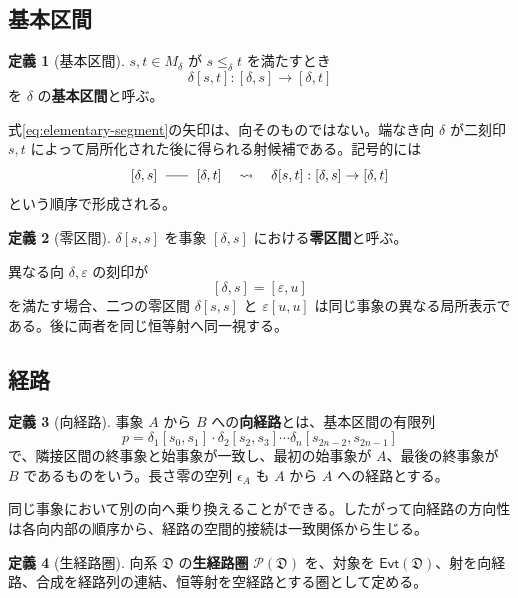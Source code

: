 \documentclass[a4paper,11pt]{ltjsarticle}
\theoremstyle{definition}
\newtheorem{definition}{定義}[section]
\theoremstyle{plain}
\newcommand{\Evt}{\mathsf{Evt}}
\newcommand{\dline}{\mathrel{\rule[0.55ex]{1.6em}{0.4pt}}}
\begin{document}
\subsection{基本区間}

\begin{definition}[基本区間]
$s,t\in M_\delta$ が $s\leq_\delta t$ を満たすとき
\begin{equation}
 \delta[s,t]:[\delta,s]\longrightarrow[\delta,t]
 \label{eq:elementary-segment}
\end{equation}
を $\delta$ の\textbf{基本区間}と呼ぶ。
\end{definition}

式\eqref{eq:elementary-segment}の矢印は、向そのものではない。端なき向 $\delta$ が二刻印 $s,t$ によって局所化された後に得られる射候補である。記号的には
\[
 [\delta,s]\ \dline\ [\delta,t]
 \quad\leadsto\quad
 \delta[s,t]:[\delta,s]\to[\delta,t]
\]
という順序で形成される。

\begin{definition}[零区間]
$\delta[s,s]$ を事象 $[\delta,s]$ における\textbf{零区間}と呼ぶ。
\end{definition}

異なる向 $\delta,\varepsilon$ の刻印が
\[
 [\delta,s]=[\varepsilon,u]
\]
を満たす場合、二つの零区間 $\delta[s,s]$ と $\varepsilon[u,u]$ は同じ事象の異なる局所表示である。後に両者を同じ恒等射へ同一視する。

\subsection{経路}

\begin{definition}[向経路]
事象 $A$ から $B$ への\textbf{向経路}とは、基本区間の有限列
\begin{equation}
 p=
 \delta_1[s_0,s_1]
 \cdot
 \delta_2[s_2,s_3]
 \cdots
 \delta_n[s_{2n-2},s_{2n-1}]
 \label{eq:direction-path}
\end{equation}
で、隣接区間の終事象と始事象が一致し、最初の始事象が $A$、最後の終事象が $B$ であるものをいう。長さ零の空列 $\epsilon_A$ も $A$ から $A$ への経路とする。
\end{definition}

同じ事象において別の向へ乗り換えることができる。したがって向経路の方向性は各向内部の順序から、経路の空間的接続は一致関係から生じる。

\begin{definition}[生経路圏]
向系 $\mathfrak D$ の\textbf{生経路圏} $\mathcal P(\mathfrak D)$ を、対象を $\Evt(\mathfrak D)$、射を向経路、合成を経路列の連結、恒等射を空経路とする圏として定める。
\end{definition}
\end{document}
